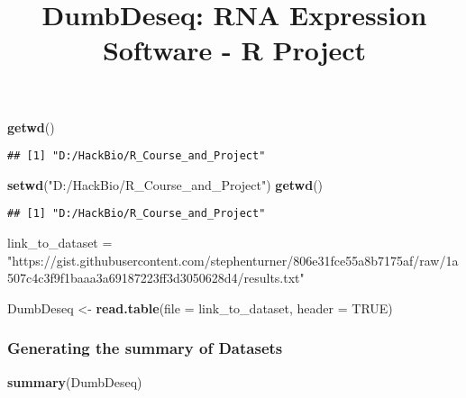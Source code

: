 \documentclass[
]{article}
\title{DumbDeseq: RNA Expression Software - R Project}
\author{}
\date{\vspace{-2.5em}}
\newenvironment{Shaded}{\begin{snugshade}}{\end{snugshade}}
\newcommand{\AttributeTok}[1]{\textcolor[rgb]{0.13,0.29,0.53}{#1}}
\newcommand{\ConstantTok}[1]{\textcolor[rgb]{0.56,0.35,0.01}{#1}}
\newcommand{\FunctionTok}[1]{\textcolor[rgb]{0.13,0.29,0.53}{\textbf{#1}}}
\newcommand{\NormalTok}[1]{#1}
\newcommand{\OtherTok}[1]{\textcolor[rgb]{0.56,0.35,0.01}{#1}}
\newcommand{\StringTok}[1]{\textcolor[rgb]{0.31,0.60,0.02}{#1}}
\begin{document}
\maketitle

\begin{Shaded}
\begin{Highlighting}[]
\FunctionTok{getwd}\NormalTok{()}
\end{Highlighting}
\end{Shaded}

\begin{verbatim}
## [1] "D:/HackBio/R_Course_and_Project"
\end{verbatim}

\begin{Shaded}
\begin{Highlighting}[]
\FunctionTok{setwd}\NormalTok{(}\StringTok{"D:/HackBio/R\_Course\_and\_Project"}\NormalTok{)}
\FunctionTok{getwd}\NormalTok{()}
\end{Highlighting}
\end{Shaded}

\begin{verbatim}
## [1] "D:/HackBio/R_Course_and_Project"
\end{verbatim}

\begin{Shaded}
\begin{Highlighting}[]
\NormalTok{link\_to\_dataset }\OtherTok{=} \StringTok{"https://gist.githubusercontent.com/stephenturner/806e31fce55a8b7175af/raw/1a507c4c3f9f1baaa3a69187223ff3d3050628d4/results.txt"}

\NormalTok{DumbDeseq }\OtherTok{\textless{}{-}} \FunctionTok{read.table}\NormalTok{(}\AttributeTok{file =}\NormalTok{ link\_to\_dataset, }\AttributeTok{header =} \ConstantTok{TRUE}\NormalTok{)}
\end{Highlighting}
\end{Shaded}

\subsubsection{Generating the summary of
Datasets}\label{generating-the-summary-of-datasets}

\begin{Shaded}
\begin{Highlighting}[]
\FunctionTok{summary}\NormalTok{(DumbDeseq)}
\end{Highlighting}
\end{Shaded}
\end{document}
